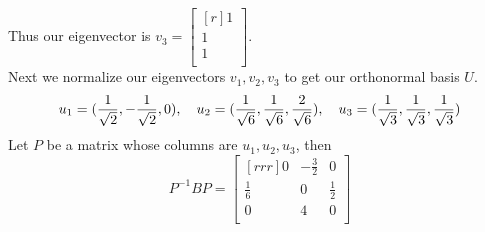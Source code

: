 \documentclass[12pt]{article}
\theoremstyle{definition}
\theoremstyle{plain}
\begin{document}
\begin{enumerate}
\begin{enumerate}
	Thus our eigenvector is $v_3=\begin{bmatrix}[r]1\\1\\1\\\end{bmatrix}$.\\
	Next we normalize our eigenvectors $v_1,v_2,v_3$ to get our orthonormal basis $U$.
	\[ u_1=(\frac{1}{\sqrt{2}},-\frac{1}{\sqrt{2}},0),\quad u_2=(\frac{1}{\sqrt{6}},\frac{1}{\sqrt{6}},\-\frac{2}{\sqrt{6}}),\quad u_3=(\frac{1}{\sqrt{3}},\frac{1}{\sqrt{3}},\frac{1}{\sqrt{3}}) \]
	Let $P$ be a matrix whose columns are $u_1,u_2,u_3$, then
	\[ P^{-1}BP = \begin{bmatrix}[rrr]0&-\frac{3}{2}&0\\\frac{1}{6}&0&\frac{1}{2}\\0&4&0\\\end{bmatrix} \]
	

\end{enumerate}
\end{enumerate}
\end{document}
